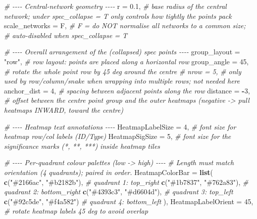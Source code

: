 \documentclass[
]{book}
\newenvironment{Shaded}{\begin{snugshade}}{\end{snugshade}}
\newcommand{\AttributeTok}[1]{\textcolor[rgb]{0.13,0.29,0.53}{#1}}
\newcommand{\CommentTok}[1]{\textcolor[rgb]{0.56,0.35,0.01}{\textit{#1}}}
\newcommand{\DecValTok}[1]{\textcolor[rgb]{0.00,0.00,0.81}{#1}}
\newcommand{\FloatTok}[1]{\textcolor[rgb]{0.00,0.00,0.81}{#1}}
\newcommand{\FunctionTok}[1]{\textcolor[rgb]{0.13,0.29,0.53}{\textbf{#1}}}
\newcommand{\NormalTok}[1]{#1}
\newcommand{\SpecialCharTok}[1]{\textcolor[rgb]{0.81,0.36,0.00}{\textbf{#1}}}
\newcommand{\StringTok}[1]{\textcolor[rgb]{0.31,0.60,0.02}{#1}}
\begin{document}
\begin{Shaded}
\begin{Highlighting}[]
  \CommentTok{\# {-}{-}{-}{-} Central{-}network geometry {-}{-}{-}{-}}
  \AttributeTok{r                  =} \FloatTok{0.1}\NormalTok{,                  }\CommentTok{\# base radius of the central network; under spec\_collapse = T only controls how tightly the points pack}
  \AttributeTok{scale\_networks     =}\NormalTok{ F,                    }\CommentTok{\# F = do NOT normalise all networks to a common size;}
                                             \CommentTok{\#     auto{-}disabled when spec\_collapse = T}

  \CommentTok{\# {-}{-}{-}{-} Overall arrangement of the (collapsed) spec points {-}{-}{-}{-}}
  \AttributeTok{group\_layout       =} \StringTok{"row"}\NormalTok{,                }\CommentTok{\# row layout: points are placed along a horizontal row}
  \AttributeTok{group\_angle        =} \DecValTok{45}\NormalTok{,                   }\CommentTok{\# rotate the whole point row by 45 deg around the centre}
  \CommentTok{\# nrow             = 5,                    \# only used by row/column/snake when wrapping into multiple rows; not needed here}
  \AttributeTok{anchor\_dist        =} \DecValTok{4}\NormalTok{,                    }\CommentTok{\# spacing between adjacent points along the row}
  \AttributeTok{distance           =} \SpecialCharTok{{-}}\DecValTok{3}\NormalTok{,                   }\CommentTok{\# offset between the centre point group and the outer heatmaps (negative {-}\textgreater{} pull heatmaps INWARD, toward the centre)}

  \CommentTok{\# {-}{-}{-}{-} Heatmap text annotations {-}{-}{-}{-}}
  \AttributeTok{HeatmapLabelSize   =} \DecValTok{4}\NormalTok{,                    }\CommentTok{\# font size for heatmap row/col labels (ID/Type)}
  \AttributeTok{HeatmapSigSize     =} \DecValTok{5}\NormalTok{,                    }\CommentTok{\# font size for the significance marks (*, **, ***) inside heatmap tiles}

  \CommentTok{\# {-}{-}{-}{-} Per{-}quadrant colour palettes (low {-}\textgreater{} high) {-}{-}{-}{-}}
  \CommentTok{\# Length must match \textasciigrave{}orientation\textasciigrave{} (4 quadrants); paired in order.}
  \AttributeTok{HeatmapColorBar    =} \FunctionTok{list}\NormalTok{(}
    \FunctionTok{c}\NormalTok{(}\StringTok{"\#2166ac"}\NormalTok{, }\StringTok{"\#b2182b"}\NormalTok{),                 }\CommentTok{\# quadrant 1: top\_right}
    \FunctionTok{c}\NormalTok{(}\StringTok{"\#1b7837"}\NormalTok{, }\StringTok{"\#762a83"}\NormalTok{),                 }\CommentTok{\# quadrant 2: bottom\_right}
    \FunctionTok{c}\NormalTok{(}\StringTok{"\#4393c3"}\NormalTok{, }\StringTok{"\#d6604d"}\NormalTok{),                 }\CommentTok{\# quadrant 3: top\_left}
    \FunctionTok{c}\NormalTok{(}\StringTok{"\#92c5de"}\NormalTok{, }\StringTok{"\#f4a582"}\NormalTok{)                  }\CommentTok{\# quadrant 4: bottom\_left}
\NormalTok{  ),}
  \AttributeTok{HeatmapLabelOrient =} \DecValTok{45}\NormalTok{,                   }\CommentTok{\# rotate heatmap labels 45 deg to avoid overlap}


\end{Highlighting}
\end{Shaded}
\end{document}
